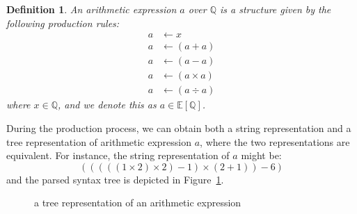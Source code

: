 \documentclass[12pt]{article}
\newtheorem{definition}{Definition}[section]
\begin{document}
\begin{definition}\label{def:arithmetic-expression-full}
    An arithmetic expression $a$ over $\mathbb{Q}$ is a structure given by the following production rules:
\begin{equation}\label{eq:productionrule-full}
\begin{aligned}
a &\longleftarrow x\\
a &\longleftarrow ( a + a )\\
a &\longleftarrow ( a - a )\\
a &\longleftarrow ( a \times a )\\
a &\longleftarrow ( a \div a )
\end{aligned}
\end{equation}
    where $x \in \mathbb{Q}$, and we denote this as $a \in \mathbb{E} \left [\mathbb{Q} \right ]$.
\end{definition}

During the production process, we can obtain both a string representation and a tree representation of arithmetic expression $a$,
where the two representations are equivalent.
For instance, the string representation of $a$ might be:
\begin{equation}
(((((1 \times 2) \times 2) - 1) \times (2 + 1)) - 6)\label{eq:equation-full}
\end{equation}
and the parsed syntax tree is depicted in Figure~\ref{fig:syntaxtree-full}.

\begin{figure}[ht]
\centering
{}
\caption{a tree representation of an arithmetic expression}\label{fig:syntaxtree-full}
\end{figure}
\end{document}
